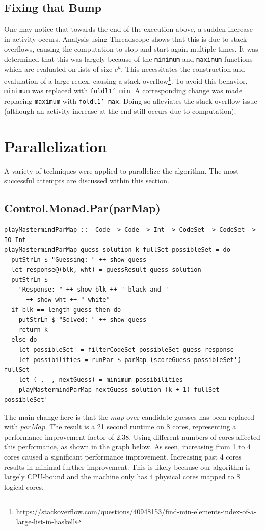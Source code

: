 \documentclass{article}
\begin{document}
\subsection{Fixing that Bump}
One may notice that towards the end of the execution above, a sudden increase in activity occurs. Analysis using Threadscope shows that this is due to stack overflows, causing the computation to stop and start again multiple times. It was determined that this was largely because of the \texttt{minimum} and \texttt{maximum} functions which are evaluated on lists of size $c^h$. This necessitates the construction and evalulation of a large redex, causing a stack overflow\footnote{https://stackoverflow.com/questions/40948153/find-min-elements-index-of-a-large-list-in-haskell}. To avoid this behavior, \texttt{minimum} was replaced with \texttt{foldl1' min}. A corresponding change was made replacing \texttt{maximum} with \texttt{foldl1' max}. Doing so alleviates the stack overflow issue (although an activity increase at the end still occurs due to computation).

\section{Parallelization}
A variety of techniques were applied to parallelize the algorithm. The most successful attempts are discussed within this section.
\subsection{Control.Monad.Par(parMap)}
\begin{verbatim}
playMastermindParMap ::  Code -> Code -> Int -> CodeSet -> CodeSet -> IO Int
playMastermindParMap guess solution k fullSet possibleSet = do
  putStrLn $ "Guessing: " ++ show guess
  let response@(blk, wht) = guessResult guess solution
  putStrLn $
    "Response: " ++ show blk ++ " black and "
      ++ show wht ++ " white"
  if blk == length guess then do
    putStrLn $ "Solved: " ++ show guess
    return k
  else do
    let possibleSet' = filterCodeSet possibleSet guess response
    let possibilities = runPar $ parMap (scoreGuess possibleSet') fullSet
    let (_, _, nextGuess) = minimum possibilities
    playMastermindParMap nextGuess solution (k + 1) fullSet possibleSet'
\end{verbatim}
The main change here is that the $map$ over candidate guesses has been replaced with $parMap$. The result is a 21 second runtime on 8 cores, representing a performance improvement factor of 2.38.
Using different numbers of cores affected this performance, as shown in the graph below. As seen, increasing from 1 to 4 cores caused a significant performance improvement. Increasing past 4 cores results in minimal further improvement. This is likely because our algorithm is largely CPU-bound and the machine only has 4 physical cores mapped to 8 logical cores.
\end{document}
